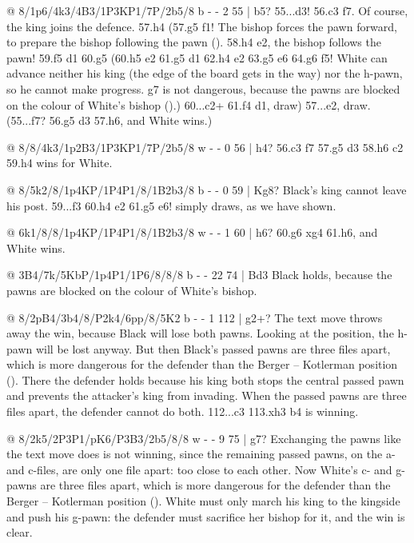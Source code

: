 @ 8/1p6/4k3/4B3/1P3KP1/7P/2b5/8 b - - 2 55 | b5?
55...\B d3! 56.\B c3 \K f7. Of course, the king joins the defence. 57.h4 (57.\K g5 \B f1! The bishop forces the pawn forward, to prepare the bishop following the pawn (). 58.h4 \B e2, the bishop follows the pawn! 59.\K f5 \B d1 60.g5 (60.h5 \B e2 61.\K g5 \B d1 62.\K h4 \B e2 63.g5 \K e6 64.g6 \K f5! White can advance neither his king (the edge of the board gets in the way) nor the h-pawn, so he cannot make progress. g7 is not dangerous, because the pawns are blocked on the colour of White's bishop ().) 60...\B c2+ 61.\K f4 \B d1, draw) 57...\B e2, draw. (55...\K f7? 56.\K g5 \B d3 57.\K h6, and White wins.)

@ 8/8/4k3/1p2B3/1P3KP1/7P/2b5/8 w - - 0 56 | h4?
56.\B c3 \K f7 57.\K g5 \B d3 58.\K h6 \B c2 59.h4 wins for White.

@ 8/5k2/8/1p4KP/1P4P1/8/1B2b3/8 b - - 0 59 | Kg8?
Black's king cannot leave his post. 59...\B f3 60.\K h4 \B e2 61.g5 \K e6! simply draws, as we have
shown.

@ 6k1/8/8/1p4KP/1P4P1/8/1B2b3/8 w - - 1 60 | h6?
60.\K g6 \B xg4 61.h6, and White wins.

@ 3B4/7k/5KbP/1p4P1/1P6/8/8/8 b - - 22 74 | Bd3
Black holds, because the pawns are blocked on the colour of White's bishop.

@ 8/2pB4/3b4/8/P2k4/6pp/8/5K2 b - - 1 112 | g2+?
The text move throws away the win, because Black will lose both pawns. Looking at the position, the h-pawn will be lost anyway. But then Black's passed pawns are three files apart, which is more dangerous for the defender than the Berger -- Kotlerman position (). There the defender holds because his king both stops the central passed pawn and prevents the attacker's king from invading. When the passed pawns are three files apart, the defender cannot do both. 112...\K c3 113.\B xh3 \K b4 is winning.

@ 8/2k5/2P3P1/pK6/P3B3/2b5/8/8 w - - 9 75 | g7?
Exchanging the pawns like the text move does is not winning, since the remaining passed pawns, on the a- and c-files, are only one file apart: too close to each other. Now White's c- and g-pawns are three files apart, which is more dangerous for the defender than the Berger -- Kotlerman position (). White must only march his king to the kingside and push his g-pawn: the defender must sacrifice her bishop for it, and the win is clear.

